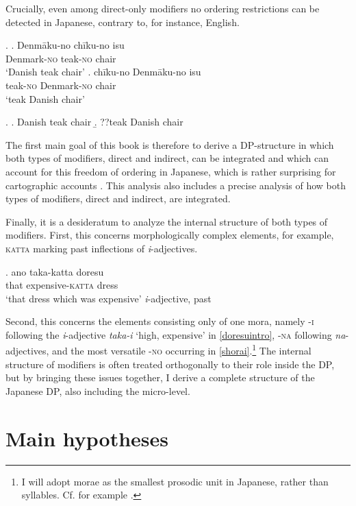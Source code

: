 \documentclass [output=book,colorlinks,citecolor=brown]{langscibook}
\begin{document}
Crucially, even among direct-only modifiers no ordering restrictions can be detected in Japanese, contrary to, for instance, English.

\ex. \ag. Denmāku-no chīku-no isu\\
Denmark-\textsc{no} teak-\textsc{no} chair\\
`Danish teak chair' \label{denmaku2}
\bg. chīku-no Denmāku-no isu\\
teak-\textsc{no} Denmark-\textsc{no} chair\\
`teak Danish chair' \label{denmaku3}

\ex. \label{danish english} \a. Danish teak chair
\b. ??teak Danish chair

The first main goal of this book is therefore to derive a DP-structure in which both types of modifiers, direct and indirect, can be integrated and which can account for this freedom of ordering in Japanese, which is rather surprising for cartographic accounts \citep{cinque:2010:adj, cinque:2017:micro}. This analysis also includes a precise analysis of how both types of modifiers, direct and indirect, are integrated.

Finally, it is a desideratum to analyze the internal structure of both types of modifiers. First, this concerns morphologically complex elements, for example, \textsc{katta} marking past inflections of \textit{i}-adjectives.

\exg. ano taka-katta doresu\\
that expensive-\textsc{katta} dress\\
`that dress which was expensive' \null \hfill \textit{i}-adjective, past \label{taka-kattaoben}

Second, this concerns the elements consisting only of one mora, namely -\textsc{i} following the \textit{i}-adjective \textit{taka-i} `high, expensive’ in \ref{doresuintro}, -\textsc{na} following \textit{na}-adjectives, and the most versatile -\textsc{no} occurring in \ref{shorai}.\footnote{I will adopt morae as the smallest prosodic unit in Japanese, rather than syllables. Cf. for example \citet{kubozono:2005:rendaku, ito:2015:word}.} The internal structure of modifiers is often treated orthogonally to their role inside the DP, but by bringing these issues together, I derive a complete structure of the Japanese DP, also including the micro-level.

\section{Main hypotheses}
\end{document}
